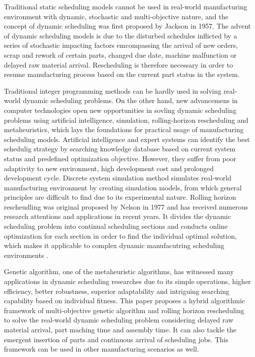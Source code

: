 
Traditional static scheduling models cannot be used in real-world manufacturing environment with dynamic, stochastic and multi-objective nature, and the concept of dynamic scheduling was first proposed by Jackson in 1957.
The advent of dynamic scheduling models is due to the disturbed schedules inflicted by a series of stochastic impacting factors emcompassing the arrival of new orders, scrap and rework of certain parts, changed due date, machine malfunction or delayed raw material arrival.
Rescheduling is therefore necessary in order to resume manufacturing process based on the current part status in the system.

Traditional integer programming methods can be hardly used in solving real-world dynamic scheduling problems.
On the other hand, new advancemens in computer technologies open new opportunities in sovling dynamic scheduling problems using artificial intelligence, simulation, rolling-horizon rescheduling and metaheuristics, which lays the foundations for practical usage of manufacturing scheduling models.
Artificial intelligence and expert systems can identify the best schedulig strategy by searching knowledge database based on current system status and predefined optimization objective.
However, they suffer from poor adaptivity to new environment, high development cost and prolonged development cycle.
Discrete system simulation method simulates real-world manufacturing environment by creating simulation models, from which general principles are difficult to find due to its experimental nature.
Rolling horizon rescheudling was original proposed by Nelson in 1977 and has received numerous research attentions and applications in recent years.
It divides the dynamic scheduling problem into continual scheduling sections and conducts online optimization for each section in order to find the individual optimal solution, which makes it applicable to complex dynamic manufacutring scheduling environments \citep{bierwirth19991, jian19972}.

Genetic algorithm, one of the metaheuristic algorithms, has witnessed many applications in dynamic scheduling researches due to its simple operations, higher efficiency, better robustness, superior adaptability and intriguing searching capability based on individual fitness. 
This paper proposes a hybrid algorithmic framework of multi-objective genetic algorithm and rolling horizon rescheduling to solve the real-world dynamic scheduling problem considering delayed raw material arrival, part maching time and assembly time.
It can also tackle the emergent insertion of parts and continuous arrival of scheduling jobs.
This framework can be used in other manufacturing scenarios as well.



















